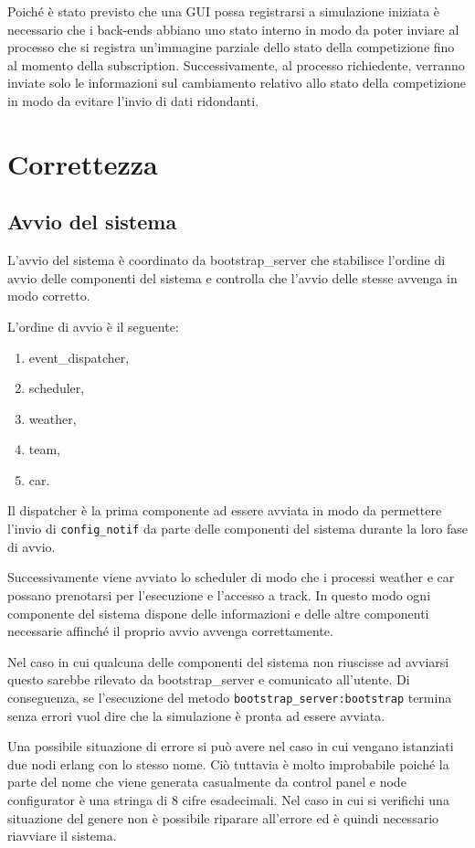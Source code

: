 \documentclass[11pt,a4paper]{report}
\newcommand{\fun}[1]{\texttt{#1}}
\begin{document}
Poiché è stato previsto che una GUI possa registrarsi a simulazione iniziata è necessario che i back-ends abbiano uno stato interno in modo da poter inviare al processo che si registra un'immagine parziale dello stato della competizione fino al momento della subscription. Successivamente, al processo richiedente, verranno inviate solo le informazioni sul cambiamento relativo allo stato della competizione in modo da evitare l'invio di dati ridondanti.


\chapter{Correttezza}
\section{Avvio del sistema}
L'avvio del sistema è coordinato da bootstrap\_server che stabilisce l'ordine di avvio delle componenti del sistema e controlla che l'avvio delle stesse avvenga in modo corretto.

L'ordine di avvio è il seguente:
\begin{enumerate}
\item event\_dispatcher,
\item scheduler,
\item weather,
\item team,
\item car.
\end{enumerate}

Il dispatcher è la prima componente ad essere avviata in modo da permettere l'invio di \fun{config\_notif} da parte delle componenti del sistema durante la loro fase di avvio.

Successivamente viene avviato lo scheduler di modo che i processi weather e car possano prenotarsi per l'esecuzione e l'accesso a track. In questo modo ogni componente del sistema dispone delle informazioni e delle altre componenti necessarie affinché il proprio avvio avvenga correttamente.

Nel caso in cui qualcuna delle componenti del sistema non riuscisse ad avviarsi questo sarebbe rilevato da bootstrap\_server e comunicato all'utente. Di conseguenza, se l'esecuzione del metodo \fun{bootstrap\_server:bootstrap} termina senza errori vuol dire che la simulazione è pronta ad essere avviata.

Una possibile situazione di errore si può avere nel caso in cui vengano istanziati due nodi erlang con lo stesso nome. Ciò tuttavia è molto improbabile poiché la  parte del nome che viene generata casualmente da control panel e node configurator è una stringa di 8 cifre esadecimali. Nel caso in cui si verifichi una situazione del genere non è possibile riparare all'errore ed è quindi necessario riavviare il sistema.
\end{document}
